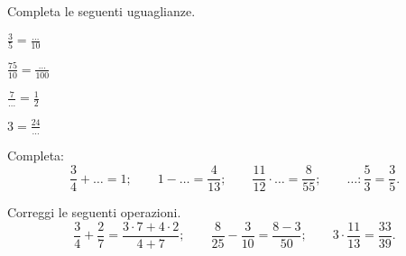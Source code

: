 
\begin{esercizio}
Completa le seguenti uguaglianze.

\begin{htmulticols}{4}
\begin{enumeratees}
\item \(\displaystyle{\frac{3}{5}=\frac{\ldots}{10}}\)
\item \(\displaystyle{\frac{75}{10}=\frac{\ldots}{100}}\)
\item \(\displaystyle{\frac{7}{\ldots}=\frac{1}{2}}\)
\item \(\displaystyle{3=\frac{24}{\ldots}}\)
\end{enumeratees}
\end{htmulticols}
\end{esercizio}

\begin{esercizio}
Completa:
\[\frac{3}{4}+\ldots=1;\qquad1-\ldots=\frac{4}{13};
\qquad\frac{11}{12} \cdot \ldots=\frac{8}{55};%
\qquad\ldots:\frac{5}{3}=\frac{3}{5}.\]
\end{esercizio}

\begin{esercizio}
Correggi le seguenti operazioni.
\[\frac{3}{4}+\frac{2}{7}=\frac{3\cdot7+4\cdot2}{4+7};\qquad%
\frac{8}{25}-\frac{3}{10}=\frac{8-3}{50};\qquad%
3\cdot\frac{11}{13}=\frac{33}{39}.\]
\end{esercizio}

